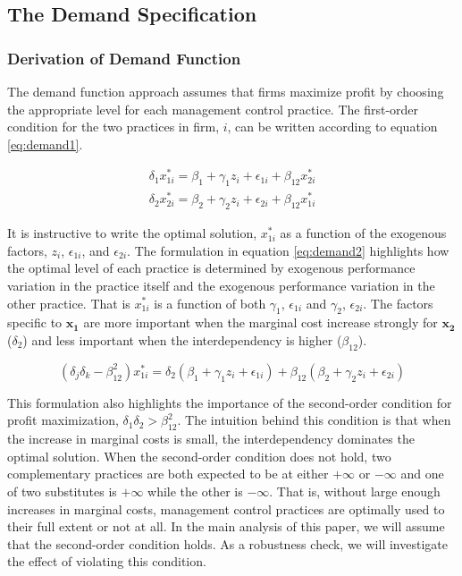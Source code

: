 \documentclass[12pt]{article}
\begin{document}
\subsection{The Demand Specification}\label{the-demand-specification}

\subsubsection{Derivation of Demand
Function}\label{derivation-of-demand-function}

The demand function approach assumes that firms maximize profit by
choosing the appropriate level for each management control practice. The
first-order condition for the two practices in firm, \(i\), can be
written according to equation \eqref{eq:demand1}.

\begin{align}\label{eq:demand1}
\delta_1 x^*_{1i} = \beta_1 + \gamma_1 z_i + \epsilon_{1i} + \beta_{12} x^*_{2i}
\\
\delta_2 x^*_{2i} = \beta_2 + \gamma_2 z_i + \epsilon_{2i} + \beta_{12} x^*_{1i}
\nonumber
\end{align}

It is instructive to write the optimal solution, \(x^*_{1i}\) as a
function of the exogenous factors, \(z_i\), \(\epsilon_{1i}\), and
\(\epsilon_{2i}\). The formulation in equation \eqref{eq:demand2}
highlights how the optimal level of each practice is determined by
exogenous performance variation in the practice itself and the exogenous
performance variation in the other practice. That is \(x^*_{1i}\) is a
function of both \(\gamma_1\), \(\epsilon_{1i}\) and \(\gamma_2\),
\(\epsilon_{2i}\). The factors specific to \(\mathbf{x_1}\) are more
important when the marginal cost increase strongly for \(\mathbf{x_2}\)
(\(\delta_2\)) and less important when the interdependency is higher
(\(\beta_{12}\)).

\begin{equation}\label{eq:demand2}
(\delta_j \delta_k - \beta_{12}^2) x^*_{1i}
    =  \delta_2 (\beta_1 + \gamma_1 z_i + \epsilon_{1i}) +
       \beta_{12} (\beta_2 + \gamma_2 z_i + \epsilon_{2i})
\end{equation}

This formulation also highlights the importance of the second-order
condition for profit maximization, \(\delta_1 \delta_2 > \beta_{12}^2\).
The intuition behind this condition is that when the increase in
marginal costs is small, the interdependency dominates the optimal
solution. When the second-order condition does not hold, two
complementary practices are both expected to be at either \(+\infty\) or
\(-\infty\) and one of two substitutes is \(+\infty\) while the other is
\(-\infty\). That is, without large enough increases in marginal costs,
management control practices are optimally used to their full extent or
not at all. In the main analysis of this paper, we will assume that the
second-order condition holds. As a robustness check, we will investigate
the effect of violating this condition.
\end{document}
